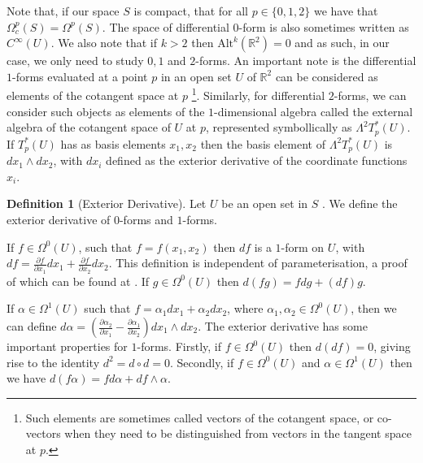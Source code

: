 \documentclass[11pt]{report}
\theoremstyle{definition}
\newtheorem{defn}[thm]{Definition}
\begin{document}
  Note that, if our space $S$ is compact, that for all $p\in \{0,1,2\}$ we have that $\Omega_c^p(S) = \Omega^p(S)$. The space of differential $0$-form is also sometimes written as $C^{\infty}(U)$. We also note that if $k > 2$ then $\text{Alt}^k(\mathbb{R}^2)=0$ and as such, in our case, we only need to study $0,1$ and $2$-forms. An important note is the differential $1$-forms evaluated at a point $p$ in an open set $U$ of $\mathbb{R}^2$ can be considered as elements of the cotangent space at $p$ \footnote{Such elements are sometimes called vectors of the cotangent space, or co-vectors when they need to be distinguished from vectors in the tangent space at $p$.}. Similarly, for differential $2$-forms, we can consider such objects as elements of the $1$-dimensional algebra called the external algebra of the cotangent space of $U$ at $p$, represented symbollically as $\Lambda^2T^*_p(U)$. If $T^*_p(U)$ has as basis elements $x_1, x_2$ then the basis element of $\Lambda^2T^*_p(U)$ is $dx_1\wedge dx_2$, with $dx_i$ defined as the exterior derivative of the coordinate functions $x_i$. 
\begin{defn}[Exterior Derivative]\label{exteriorD}
  Let $U$ be an open set in $S$ . We define the exterior derivative of $0$-forms and $1$-forms.
  
  If $f \in \Omega^0(U)$, such that $f=f(x_1,x_2)$ then $df$ is a $1$-form on $U$, with $df = \frac{\partial f}{\partial x_1}dx_1 +  \frac{\partial f}{\partial x_2}dx_2$. This definition is independent of parameterisation, a proof of which can be found at \cite[p.50]{donaldson}. If $g \in \Omega^0(U)$ then $d(fg) = fdg + (df)g$.

  If $\alpha \in \Omega^1(U)$ such that $f=\alpha_1 dx_1 + \alpha_2 dx_2$, where $\alpha_1, \alpha_2 \in \Omega^0(U)$, then we can define $d\alpha = \left(\frac{\partial \alpha_2}{\partial x_1} - \frac{\partial \alpha_1}{\partial x_2}\right) dx_1\wedge dx_2$. The exterior derivative has some important properties for $1$-forms. Firstly, if $f \in \Omega^0(U)$ then $d(df) = 0$, giving rise to the identity $d^2 = d\circ d = 0$. Secondly, if $f \in \Omega^0(U)$ and $\alpha \in \Omega^1(U)$ then we have $d(f\alpha) = fd\alpha + df \wedge \alpha$. 
\end{defn}
\end{document}
